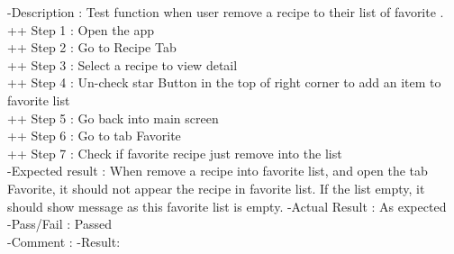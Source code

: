 \documentclass{article}
\begin{document}
    -Description : Test function when user remove a recipe to their list of favorite . \\
    ++ Step 1 : Open the app  \\
    ++ Step 2 : Go to Recipe Tab \\
    ++ Step 3 : Select a recipe to view detail   \\
    ++ Step 4 : Un-check star Button in the top of right corner to add an item to favorite list\\
    ++ Step 5 : Go back into main screen  \\
    ++ Step 6 :  Go to tab Favorite  \\
    ++ Step 7 : Check if favorite recipe just remove into the list \\
    -Expected result : When remove a recipe into favorite list, and open the tab Favorite, it should not appear the recipe in favorite list. If the list empty, it should show message as this favorite list is empty.
    -Actual Result : As expected \\
    -Pass/Fail : Passed \\
    -Comment : 
    -Result:
\end{document}
